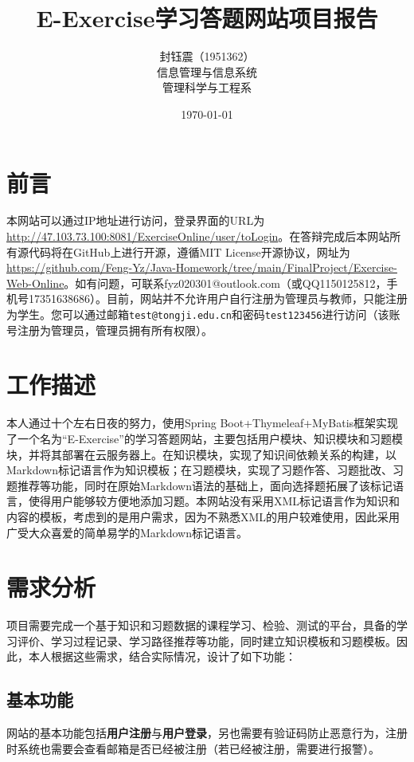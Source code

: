 \documentclass{nwafucoursepaper}
\title{\bfseries\sffamily E-Exercise学习答题网站项目报告}
\author{\zihao{4} \fangsong 封钰震（1951362）\\\fangsong 信息管理与信息系统 \\\small \songti 管理科学与工程系}
\date{\small \today}
\begin{document}
\maketitle
\thispagestyle{empty}

\section{前言}

本网站可以通过IP地址进行访问，登录界面的URL为\url{http://47.103.73.100:8081/ExerciseOnline/user/toLogin}。在答辩完成后本网站所有源代码将在GitHub上进行开源，遵循MIT License开源协议，网址为\url{https://github.com/Feng-Yz/Java-Homework/tree/main/FinalProject/Exercise-Web-Online}。如有问题，可联系fyz020301@outlook.com（或QQ1150125812，手机号17351638686）。目前，网站并不允许用户自行注册为管理员与教师，只能注册为学生。您可以通过邮箱\verb|test@tongji.edu.cn|和密码\verb|test123456|进行访问（该账号注册为管理员，管理员拥有所有权限）。

\section{工作描述}

本人通过十个左右日夜的努力，使用Spring Boot+Thymeleaf+MyBatis框架实现了一个名为“E-Exercise”的学习答题网站，主要包括用户模块、知识模块和习题模块，并将其部署在云服务器上。在知识模块，实现了知识间依赖关系的构建，以Markdown标记语言作为知识模板；在习题模块，实现了习题作答、习题批改、习题推荐等功能，同时在原始Markdown语法的基础上，面向选择题拓展了该标记语言，使得用户能够较方便地添加习题。本网站没有采用XML标记语言作为知识和内容的模板，考虑到的是用户需求，因为不熟悉XML的用户较难使用，因此采用广受大众喜爱的简单易学的Markdown标记语言。

\section{需求分析}

项目需要完成一个基于知识和习题数据的课程学习、检验、测试的平台，具备的学习评价、学习过程记录、学习路径推荐等功能，同时建立知识模板和习题模板。因此，本人根据这些需求，结合实际情况，设计了如下功能：

\subsection{基本功能}

网站的基本功能包括\textbf{用户注册}与\textbf{用户登录}，另也需要有验证码防止恶意行为，注册时系统也需要会查看邮箱是否已经被注册（若已经被注册，需要进行报警）。
\end{document}
